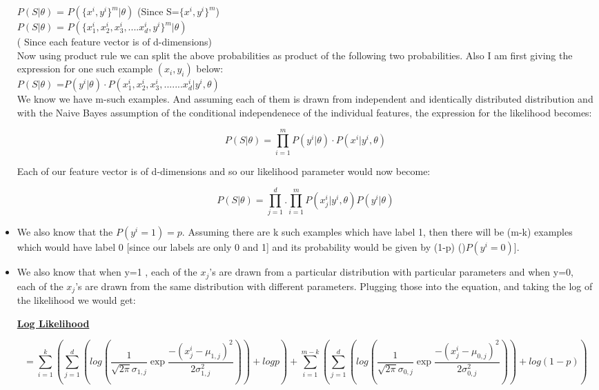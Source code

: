\documentclass[11pt]{article}
\begin{document}
\begin{itemize}
	$P(S | \theta )$ = $P(\{x^i,y^i\}^m | \theta)$  (Since S=$\{x^i, y^i\}^m$)\\
	$P(S | \theta )$ = $P(\{x_{1}^{i}, x_{2}^{i}, x_{3}^{i}, ....x_{d}^{i}, y^i\}^m | \theta)$\\ ( Since each feature vector is of d-dimensions)\\
	
	Now using product rule we can split the above probabilities as  product of the following two probabilities. Also I am first giving the expression for one such example $(x_i,y_i)$ below:\\
	
	$P(S | \theta )$ =$P(y^i | \theta) \cdot P(x^{i}_{1}, x_{2}^{i}, x_{3}^{i},....... x_{d}^{i}| y^i, \theta)$ \\
	
	We know we have m-such examples. And assuming each of them is drawn from independent and identically distributed  distribution and with the Naive Bayes assumption of the conditional independenece of the individual features, the expression for the likelihood becomes: 
	
	$$\boxed{P(S | \theta )= \prod_{i=1}^{m} P(y^i | \theta) \cdot P(x^{i} | y^i, \theta)}$$
	
	Each of our feature vector is of d-dimensions and so our likelihood parameter would now become:
	
	$$P(S| \theta) = \prod_{j=1}^{d} . \prod_{i=1}^{m} P(x_{j}^{i} |y^i,\theta) P(y^i|\theta)$$
	
	\item We also know that the $P(y^i =1) =p$. Assuming there are k such examples which have label 1, then there will be (m-k) examples which would have label 0 [since our labels are only 0 and 1] and its probability would be given by (1-p) ()$P(y^i=0)$]. 
	
	\item We also know that when y=1 , each of the $x_j$'s are drawn from a particular distribution with particular parameters and when y=0, each of the $x_j$'s are drawn from the same distribution with different parameters. Plugging those into the equation, and taking the log of the likelihood we would get:
	
		\textbf{\underline{Log Likelihood}}
			
		$$= \sum_{i=1}^{k} ( \sum_{j=1}^{d}  ( log( \frac{1}{\sqrt{2\pi}\sigma_{1,j}} \exp{\frac{-(x_j^{i} - \mu_{1,j})^2}  {2\sigma_{1,j} ^2 }}) ) + log p) + \sum_{i=1}^{m-k} (\sum_{j=1}^{d} (log(\frac{1}{\sqrt{2\pi}\sigma_{0,j}} \exp{\frac{-(x_j^{i} - \mu_{0,j})^2}  {2\sigma_{0,j} ^2 }})) + log(1-p)) $$
	


\end{itemize}
\end{document}
